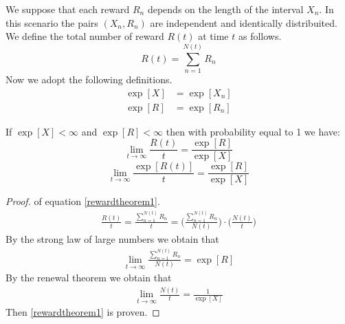 We suppose that each reward $R_n$ depends on the length of the interval $X_n$. In this scenario the pairs $(X_n, R_n)$ are independent and identically distribuited. We define the total number of reward $R(t)$ at time $t$ as follows.
\begin{equation}
	R(t)=\sum_{n=1}^{N(t)}R_n
\end{equation}
Now we adopt the following definitions.
\begin{align*}
	\exp[X] & =\exp[X_n]
	\\ \exp[R] & =\exp[R_n]
\end{align*}
\begin{theorem}[Th. 3.6 (Ross)]
  If $\exp[X]<\infty$ and $\exp[R]<\infty$ then with probability equal to 1 we have:
	\begin{equation}
		\lim_{t \to \infty}\frac{R(t)}{t}=\frac{\exp[R]}{\exp[X]}
		\label{rewardtheorem1}
	\end{equation}
	\begin{equation}
		\lim_{t \to \infty}\frac{\exp[R(t)]}{t}=\frac{\exp[R]}{\exp[X]}
		\label{rewardtheorem2}
	\end{equation}
\end{theorem}
\begin{proof} of equation \ref{rewardtheorem1}.
	\begin{align*}
		\frac{R(t)}{t}=\frac{\sum_{n=1}^{N(t)}R_n}{t}= \bigg( \frac{\sum_{n=1}^{N(t)}R_n}{N(t)}\bigg)\cdot\bigg(\frac{N(t)}{t}\bigg)
	\end{align*}
	By the strong law of large numbers we obtain that
	\begin{align*}
		\lim_{t \to \infty}\frac{\sum_{n=1}^{N(t)}R_n}{N(t)}=\exp[R]
	\end{align*}
	By the renewal theorem we obtain that
	\begin{align*}
		\lim_{t \to \infty} \frac{N(t)}{t}=\frac{1}{\exp[X]}
	\end{align*}
	Then \ref{rewardtheorem1} is proven.
\end{proof}
